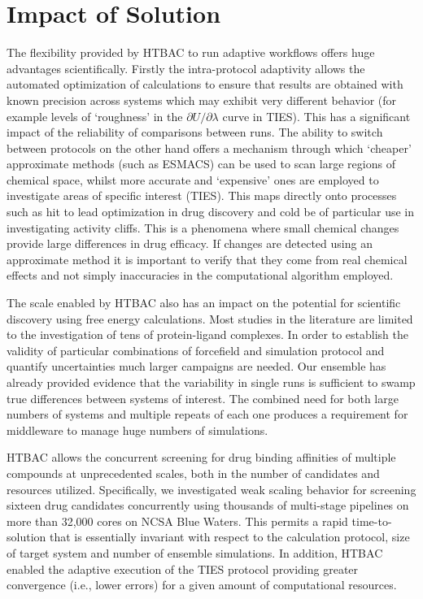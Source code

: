 \documentclass[conference]{IEEEtran}
\begin{document}
\section{Impact of Solution}\label{sec:impact}


The flexibility provided by HTBAC to run adaptive workflows offers huge advantages scientifically.
Firstly the intra-protocol adaptivity allows the automated optimization of calculations to ensure that
results are obtained with known precision across systems which may exhibit very different behavior (for example levels of `roughness' in the $\partial U/\partial\lambda$ curve in TIES).
This has a significant impact of the reliability of comparisons between runs.
The ability to switch between protocols on the other hand offers a mechanism through which `cheaper' approximate methods (such as ESMACS) can be used to scan large regions of chemical space, whilst more accurate and `expensive' ones are employed to investigate areas of specific interest (TIES).
This maps directly onto processes such as hit to lead optimization in drug discovery and cold be of particular use in investigating activity cliffs.
This is a phenomena where small chemical changes provide large differences in drug efficacy.
If changes are detected using an approximate method it is important to verify that they come from
real chemical effects and not simply inaccuracies in the computational algorithm employed.

The scale enabled by HTBAC also has an impact on the potential for scientific discovery using free energy calculations.
Most studies in the literature are limited to the investigation of tens of protein-ligand complexes.
In order to establish the validity of particular combinations of forcefield and simulation protocol and
quantify uncertainties much larger campaigns are needed.
Our ensemble has already provided evidence that the variability in single runs is sufficient to
swamp true differences between systems of interest.
The combined need for both large numbers of systems and multiple repeats of each one produces a requirement
for middleware to manage huge numbers of simulations.

HTBAC allows the concurrent screening
for drug binding affinities of multiple compounds at unprecedented scales,
both in the number of candidates and resources utilized. Specifically, we
investigated weak scaling behavior for screening sixteen drug candidates
concurrently using thousands of multi-stage pipelines on more than 32,000
cores on NCSA Blue Waters. This permits a rapid time-to-solution that is
essentially invariant with respect to the calculation protocol,
size of target system and number of ensemble simulations. In addition,
HTBAC enabled the adaptive execution of the TIES protocol
providing greater convergence (i.e., lower errors) for a given amount of
computational resources.
\end{document}
